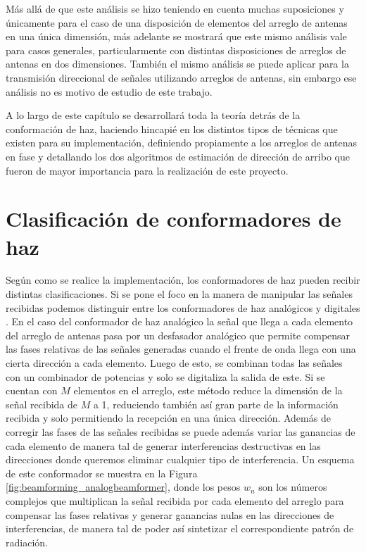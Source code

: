 Más allá de que este análisis se hizo teniendo en cuenta muchas suposiciones y únicamente para el caso de una disposición de elementos del arreglo de antenas en una única dimensión, más adelante se mostrará que este mismo análisis vale para casos generales, particularmente con distintas disposiciones de arreglos de antenas en dos dimensiones. También el mismo análisis se puede aplicar para la transmisión direccional de señales utilizando arreglos de antenas, sin embargo ese análisis no es motivo de estudio de este trabajo.

A lo largo de este capítulo se desarrollará toda la teoría detrás de la conformación de haz, haciendo hincapié en los distintos tipos de técnicas que existen para su implementación, definiendo propiamente a los arreglos de antenas en fase y detallando los dos algoritmos de estimación de dirección de arribo que fueron de mayor importancia para la realización de este proyecto.



\section{Clasificación de conformadores de haz}

Según como se realice la implementación, los conformadores de haz pueden recibir distintas clasificaciones. Si se pone el foco en la manera de manipular las señales recibidas podemos distinguir entre los conformadores de haz analógicos y digitales \cite{bib:steiskalp107-108}. En el caso del conformador de haz analógico la señal que llega a cada elemento del arreglo de antenas pasa por un desfasador analógico que permite compensar las fases relativas de las señales generadas cuando el frente de onda llega con una cierta dirección a cada elemento. Luego de esto, se combinan todas las señales con un combinador de potencias y solo se digitaliza la salida de este. Si se cuentan con $M$ elementos en el arreglo, este método reduce la dimensión de la señal recibida de $M$ a 1, reduciendo también así gran parte de la información recibida y solo permitiendo la recepción en una única dirección. Además de corregir las fases de las señales recibidas se puede además variar las ganancias de cada elemento de manera tal de generar interferencias destructivas en las direcciones donde queremos eliminar cualquier tipo de interferencia. Un esquema de este conformador se muestra en la Figura \ref{fig:beamforming_analogbeamformer}, donde los pesos $w_n$ son los números complejos que multiplican la señal recibida por cada elemento del arreglo para compensar las fases relativas y generar ganancias nulas en las direcciones de interferencias, de manera tal de poder así sintetizar el correspondiente patrón de radiación.


